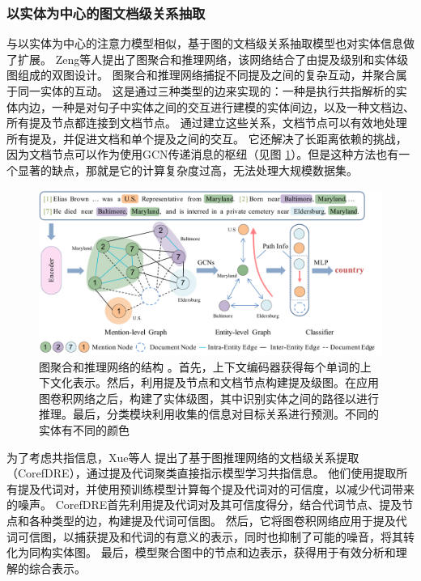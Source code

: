 \documentclass[bachelor]{thesis-uestc}
\begin{document}
\subsubsection{以实体为中心的图文档级关系抽取}\label{subsec:entity-centric-graph}

与以实体为中心的注意力模型相似，基于图的文档级关系抽取模型也对实体信息做了扩展。
Zeng等人\cite{GAIN}提出了图聚合和推理网络，该网络结合了由提及级别和实体级图组成的双图设计。
图聚合和推理网络捕捉不同提及之间的复杂互动，并聚合属于同一实体的互动。
这是通过三种类型的边来实现的：一种是执行共指解析的实体内边，一种是对句子中实体之间的交互进行建模的实体间边，以及一种文档边、所有提及节点都连接到文档节点。
通过建立这些关系，文档节点可以有效地处理所有提及，并促进文档和单个提及之间的交互。
它还解决了长距离依赖的挑战，因为文档节点可以作为使用GCN传递消息的枢纽（见图 \ref{fig:GAIN}）。但是这种方法也有一个显著的缺点，那就是它的计算复杂度过高，无法处理大规模数据集。\par

\begin{figure}
    \centering
    \includegraphics[width=0.8\linewidth]{misc/model.pdf}
    \caption{图聚合和推理网络的结构 \cite{GAIN}。首先，上下文编码器获得每个单词的上下文化表示。然后，利用提及节点和文档节点构建提及级图。在应用图卷积网络之后，构建了实体级图，其中识别实体之间的路径以进行推理。最后，分类模块利用收集的信息对目标关系进行预测。不同的实体有不同的颜色}
    \label{fig:GAIN}
\end{figure}

为了考虑共指信息，Xue等人 \cite{y2020-coreferential}提出了基于图推理网络的文档级关系提取（CorefDRE），通过提及代词聚类直接指示模型学习共指信息。
他们使用提取所有提及代词对，并使用预训练模型计算每个提及代词对的可信度，以减少代词带来的噪声。
CorefDRE首先利用提及代词对及其可信度得分，结合代词节点、提及节点和各种类型的边，构建提及代词可信图。
然后，它将图卷积网络应用于提及代词可信图，以捕获提及和代词的有意义的表示，同时也抑制了可能的噪音，将其转化为同构实体图。
最后，模型聚合图中的节点和边表示，获得用于有效分析和理解的综合表示。\par
\end{document}

